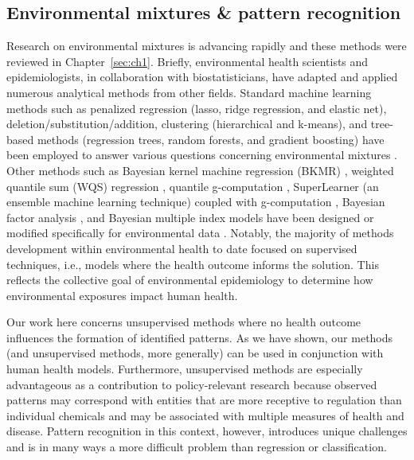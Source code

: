 \subsection{Environmental mixtures \& pattern recognition}
\label{sec:mixtures}
Research on environmental mixtures is advancing rapidly and these methods were reviewed in Chapter~\ref{sec:ch1}. Briefly, environmental health scientists and epidemiologists, in collaboration with biostatisticians, have adapted and applied numerous analytical methods from other fields. Standard machine learning methods such as penalized regression (lasso, ridge regression, and elastic net), deletion/substitution/addition, clustering (hierarchical and k-means), and tree-based methods (regression trees, random forests, and gradient boosting) have been employed to answer various questions concerning environmental mixtures \cite{tanner2020environmental, oskar2020machine, choirat2019data, vuong2020chemical, lazarevic2019statistical, coker2018multi, hamra2018environmental, huang2018cumulative, stafoggia2017statistical}. Other methods such as Bayesian kernel machine regression (BKMR) \cite{bobb2014bayesian, bobb2018statistical}, weighted quantile sum (WQS) regression \cite{carrico15}, quantile g-computation \cite{keil2020quantile}, SuperLearner (an ensemble machine learning technique) coupled with g-computation \cite{oulhote2019joint}, Bayesian factor analysis \cite{ferrari2020bayesian, bhattacharya2011sparse}, and Bayesian multiple index models have been designed or modified specifically for environmental data \cite{mcgee2021bayesian}. Notably, the majority of methods development within environmental health to date focused on supervised techniques, i.e., models where the health outcome informs the solution. This reflects the collective goal of environmental epidemiology to determine how environmental exposures impact human health.

Our work here concerns unsupervised methods where no health outcome influences the formation of identified patterns. As we have shown, our methods (and unsupervised methods, more generally) can be used in conjunction with human health models.  Furthermore, unsupervised methods are especially advantageous as a contribution to policy-relevant research because observed patterns may correspond with entities that are more receptive to regulation than individual chemicals and may be associated with multiple measures of health and disease. Pattern recognition in this context, however, introduces unique challenges and is in many ways a more difficult problem than regression or classification.

